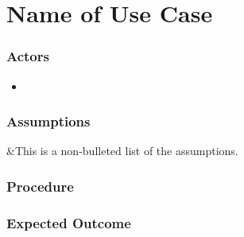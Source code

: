 
\section{Name of Use Case}


\subsubsection{Actors}
\begin{itemize}
	\item
\end{itemize}


\subsubsection{Assumptions}

&This is a non-bulleted list of the assumptions.

\subsubsection{Procedure}


\subsubsection{Expected Outcome}

